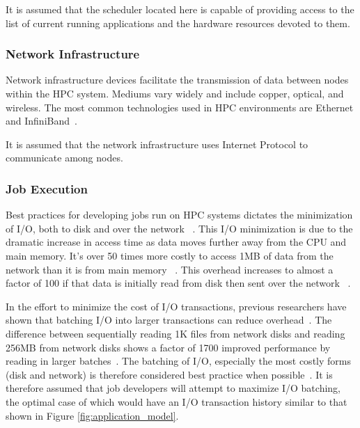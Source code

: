 \documentclass[oneside,12pt]{memoir}
\begin{document}
It is assumed that the scheduler located here is capable of providing access to the list of current running applications and the hardware resources devoted to them. 
\subsubsection{Network Infrastructure}
Network infrastructure devices facilitate the transmission of data between nodes within the HPC system. Mediums vary widely and include copper, optical, and wireless. The most common technologies used in HPC environments are Ethernet and InfiniBand~\cite{bozzo2006design}\cite{madai2010performance}. 

It is assumed that the network infrastructure uses Internet Protocol to communicate among nodes.

\subsubsection{Job Execution}
Best practices for developing jobs run on HPC systems dictates the minimization of I/O, both to disk and over the network ~\cite{shan2007using}. This I/O minimization is due to the dramatic increase in access time as data moves further away from the CPU and main memory. It's over 50 times more costly to access 1MB of data from the network than it is from main memory ~\cite{dean2009designs}. This overhead increases to almost a factor of 100 if that data is initially read from disk then sent over the network ~\cite{dean2009designs}.

In the effort to minimize the cost of I/O transactions, previous researchers have shown that batching I/O into larger transactions can reduce overhead~\cite{shan2008characterizing}. The difference between sequentially reading 1K files from network disks and reading 256MB from network disks shows a factor of 1700 improved performance by reading in larger batches~\cite{shan2007using}. The batching of I/O, especially the most costly forms (disk and network) is therefore considered best practice when possible~\cite{borrill2007investigation}. It is therefore assumed that job developers will attempt to maximize I/O batching, the optimal case of which would have an I/O transaction history similar to that shown in Figure \ref{fig:application_model}.
\end{document}
